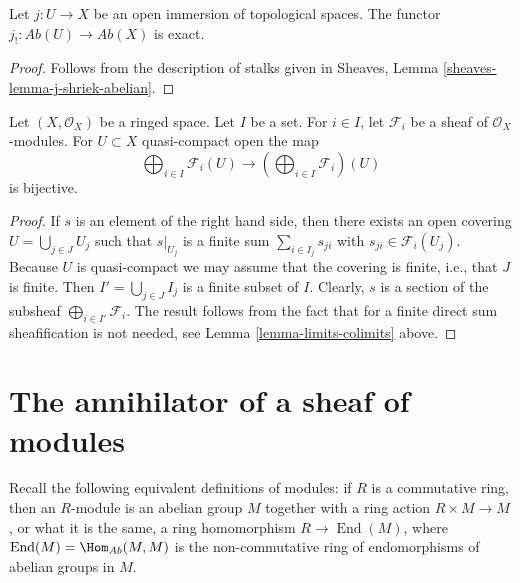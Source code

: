 \begin{lemma}
\label{lemma-j-shriek-exact}
Let $j : U \to X$ be an open immersion of topological spaces.
The functor $j_! : \textit{Ab}(U) \to \textit{Ab}(X)$
is exact.
\end{lemma}

\begin{proof}
Follows from the description of stalks
given in Sheaves, Lemma \ref{sheaves-lemma-j-shriek-abelian}.
\end{proof}

\begin{lemma}
\label{lemma-section-direct-sum-quasi-compact}
Let $(X, \mathcal{O}_X)$ be a ringed space.
Let $I$ be a set. For $i \in I$, let $\mathcal{F}_i$
be a sheaf of $\mathcal{O}_X$-modules.
For $U \subset X$ quasi-compact open the map
$$
\bigoplus\nolimits_{i \in I} \mathcal{F}_i(U)
\longrightarrow
\left(\bigoplus\nolimits_{i \in I} \mathcal{F}_i\right)(U)
$$
is bijective.
\end{lemma}

\begin{proof}
If $s$ is an element of the right hand side, then
there exists an open covering $U = \bigcup_{j \in J} U_j$
such that $s|_{U_j}$ is a finite sum
$\sum_{i \in I_j} s_{ji}$ with $s_{ji} \in \mathcal{F}_i(U_j)$.
Because $U$ is quasi-compact we may assume that the
covering is finite, i.e., that $J$ is finite.
Then $I' = \bigcup_{j \in J} I_j$ is a finite subset of
$I$. Clearly, $s$ is a section of the subsheaf
$\bigoplus_{i \in I'} \mathcal{F}_i$. The result follows
from the fact that for a finite direct sum sheafification
is not needed, see Lemma \ref{lemma-limits-colimits} above.
\end{proof}


\section{The annihilator of a sheaf of modules}
Recall the following equivalent definitions of modules:
if $R$ is a commutative ring, then an $R$-module is an abelian group $M$
together with a ring action $R\times M\to M$, or what it is the same,
a ring homomorphism $R\to\operatorname{End}(M)$,
where $\operatorname{End}(M)=\Hom_{Ab}(M,M)$ is
the non-commutative ring of endomorphisms of abelian groups in $M$. 

